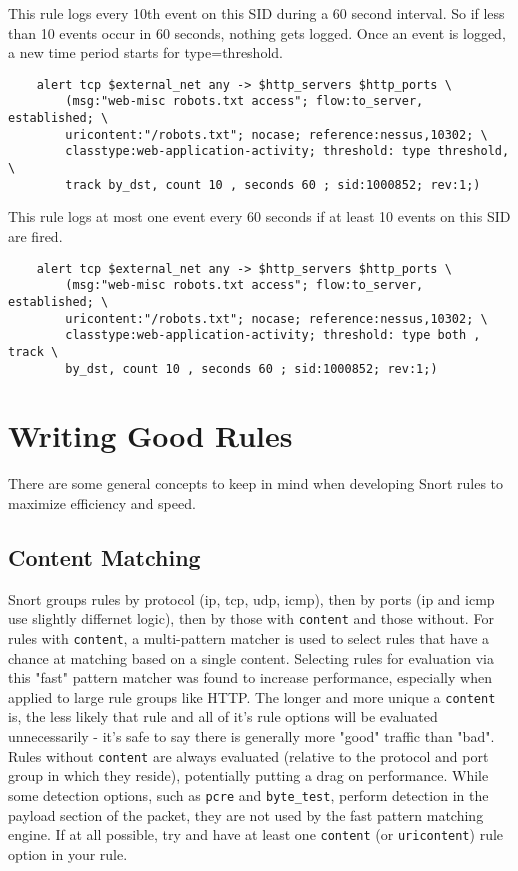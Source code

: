 \documentclass[english]{report}
\begin{document}
This rule logs every 10th event on this SID during a 60 second interval. So if
less than 10 events occur in 60 seconds, nothing gets logged.  Once an event is
logged, a new time period starts for type=threshold.

\begin{verbatim}
    alert tcp $external_net any -> $http_servers $http_ports \
        (msg:"web-misc robots.txt access"; flow:to_server, established; \
        uricontent:"/robots.txt"; nocase; reference:nessus,10302; \
        classtype:web-application-activity; threshold: type threshold, \
        track by_dst, count 10 , seconds 60 ; sid:1000852; rev:1;)
\end{verbatim}

This rule logs at most one event every 60 seconds if at least 10 events on this
SID are fired.

\begin{verbatim}
    alert tcp $external_net any -> $http_servers $http_ports \
        (msg:"web-misc robots.txt access"; flow:to_server, established; \
        uricontent:"/robots.txt"; nocase; reference:nessus,10302; \
        classtype:web-application-activity; threshold: type both , track \
        by_dst, count 10 , seconds 60 ; sid:1000852; rev:1;)
\end{verbatim}

\section{Writing Good Rules}

There are some general concepts to keep in mind when developing Snort rules to
maximize efficiency and speed.

\subsection{Content Matching}

Snort groups rules by protocol (ip, tcp, udp, icmp), then by ports
(ip and icmp use slightly differnet logic), then by those with \texttt{content}
and those without.  For rules with \texttt{content}, a multi-pattern matcher is
used to select rules that have a chance at matching based on a single content.
Selecting rules for evaluation via this "fast" pattern matcher was found to
increase performance, especially when applied to large rule groups like HTTP.
The longer and more unique a \texttt{content} is, the less likely that rule and
all of it's rule options will be evaluated unnecessarily - it's safe to say
there is generally more "good" traffic than "bad".  Rules without
\texttt{content} are always evaluated (relative to the protocol and port group
in which they reside), potentially putting a drag on performance.
While some detection options, such as \texttt{pcre} and \texttt{byte\_test},
perform detection in the payload section of the packet, they are not used by the
fast pattern matching engine.  If at all possible, try and have at least one
\texttt{content} (or \texttt{uricontent}) rule option in your rule.
\end{document}
